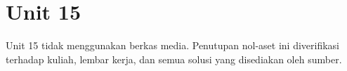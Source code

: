 \section*{Unit 15}
Unit 15 tidak menggunakan berkas media. Penutupan nol-aset ini diverifikasi terhadap kuliah, lembar kerja, dan semua solusi yang disediakan oleh sumber.
